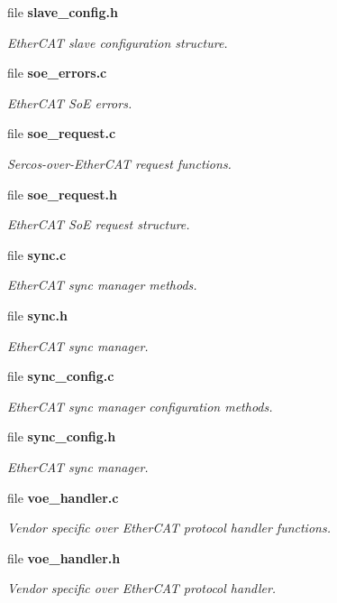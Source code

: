 \begin{DoxyCompactItemize}
file {\bf slave\-\_\-config.\-h}
\begin{DoxyCompactList}\small\item\em Ether\-C\-A\-T slave configuration structure. \end{DoxyCompactList}\item 
file {\bf soe\-\_\-errors.\-c}
\begin{DoxyCompactList}\small\item\em Ether\-C\-A\-T So\-E errors. \end{DoxyCompactList}\item 
file {\bf soe\-\_\-request.\-c}
\begin{DoxyCompactList}\small\item\em Sercos-\/over-\/\-Ether\-C\-A\-T request functions. \end{DoxyCompactList}\item 
file {\bf soe\-\_\-request.\-h}
\begin{DoxyCompactList}\small\item\em Ether\-C\-A\-T So\-E request structure. \end{DoxyCompactList}\item 
file {\bf sync.\-c}
\begin{DoxyCompactList}\small\item\em Ether\-C\-A\-T sync manager methods. \end{DoxyCompactList}\item 
file {\bf sync.\-h}
\begin{DoxyCompactList}\small\item\em Ether\-C\-A\-T sync manager. \end{DoxyCompactList}\item 
file {\bf sync\-\_\-config.\-c}
\begin{DoxyCompactList}\small\item\em Ether\-C\-A\-T sync manager configuration methods. \end{DoxyCompactList}\item 
file {\bf sync\-\_\-config.\-h}
\begin{DoxyCompactList}\small\item\em Ether\-C\-A\-T sync manager. \end{DoxyCompactList}\item 
file {\bf voe\-\_\-handler.\-c}
\begin{DoxyCompactList}\small\item\em Vendor specific over Ether\-C\-A\-T protocol handler functions. \end{DoxyCompactList}\item 
file {\bf voe\-\_\-handler.\-h}
\begin{DoxyCompactList}\small\item\em Vendor specific over Ether\-C\-A\-T protocol handler. \end{DoxyCompactList}\end{DoxyCompactItemize}
